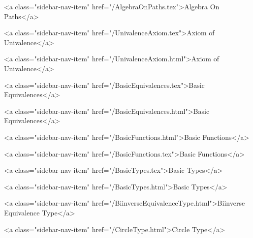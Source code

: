           <a class="sidebar-nav-item" href="/AlgebraOnPaths.tex">Algebra On Paths</a>
        
      
    
      
        
          <a class="sidebar-nav-item" href="/UnivalenceAxiom.tex">Axiom of Univalence</a>
        
      
    
      
        
          <a class="sidebar-nav-item" href="/UnivalenceAxiom.html">Axiom of Univalence</a>
        
      
    
      
        
          <a class="sidebar-nav-item" href="/BasicEquivalences.tex">Basic Equivalences</a>
        
      
    
      
        
          <a class="sidebar-nav-item" href="/BasicEquivalences.html">Basic Equivalences</a>
        
      
    
      
        
          <a class="sidebar-nav-item" href="/BasicFunctions.html">Basic Functions</a>
        
      
    
      
        
          <a class="sidebar-nav-item" href="/BasicFunctions.tex">Basic Functions</a>
        
      
    
      
        
          <a class="sidebar-nav-item" href="/BasicTypes.tex">Basic Types</a>
        
      
    
      
        
          <a class="sidebar-nav-item" href="/BasicTypes.html">Basic Types</a>
        
      
    
      
        
          <a class="sidebar-nav-item" href="/BiinverseEquivalenceType.html">Biinverse Equivalence Type</a>
        
      
    
      
        
          <a class="sidebar-nav-item" href="/CircleType.html">Circle Type</a>
        
      
    
